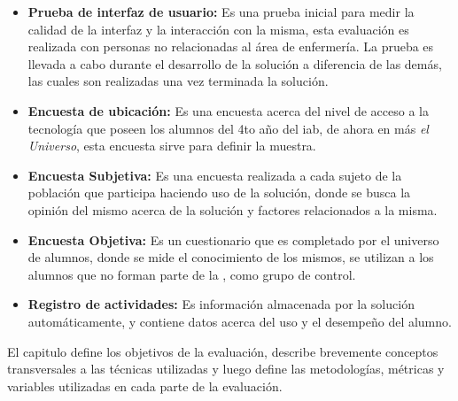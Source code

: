\begin{itemize}
    \item \textbf{Prueba de interfaz de usuario:} Es una prueba inicial para
    medir la calidad de la interfaz y la interacción con la misma, esta
    evaluación es realizada con personas no relacionadas al área de enfermería.
    La prueba es llevada a cabo durante el desarrollo de la solución a
    diferencia de las demás, las cuales son realizadas una vez terminada la
    solución.


    \item \textbf{Encuesta de ubicación:} Es una encuesta acerca del nivel de
    acceso a la tecnología que poseen los alumnos del 4to año del \Gls{iab}, de
    ahora en más \textit{el Universo}, esta encuesta sirve
    para definir la muestra.

    \item \textbf{Encuesta Subjetiva:} Es una encuesta realizada a cada sujeto
    de la población que participa haciendo uso de la solución, donde se busca la
    opinión del mismo acerca de la solución y factores relacionados a la misma. 

    \item \textbf{Encuesta Objetiva:} Es un cuestionario que es completado por
    el universo de alumnos, donde se mide el conocimiento de los mismos, se
    utilizan a los  alumnos que no forman parte de
    la , como grupo de control.

    \item \textbf{Registro de actividades:} Es información almacenada por la
    solución automáticamente, y contiene datos acerca del uso y el desempeño del
    alumno.
        
\end{itemize}

El capitulo define los objetivos de la evaluación, describe brevemente conceptos
transversales a las técnicas utilizadas y luego define las metodologías,
métricas y variables utilizadas en cada parte de la evaluación.









